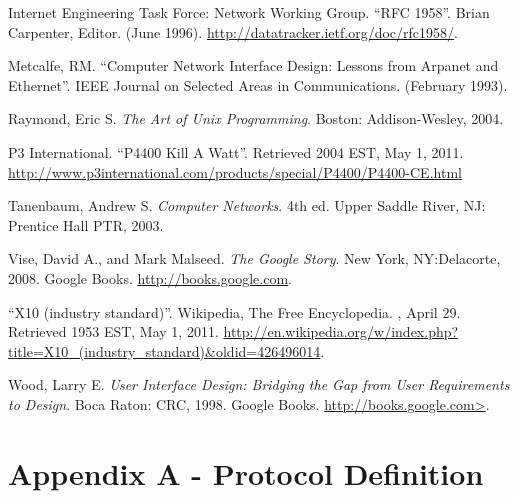 \documentclass[12pt]{article}
\begin{document}
\renewcommand{\refname}{\section{References}}
\begin{thebibliography}{10}

 Internet Engineering Task Force: Network Working Group.
  \newblock ``RFC 1958''.
  \newblock Brian Carpenter, Editor.
  \newblock (June 1996).
  \newblock \url{http://datatracker.ietf.org/doc/rfc1958/}.

 Metcalfe, RM.
  \newblock ``Computer Network Interface Design: Lessons from
  Arpanet and Ethernet''.
  \newblock IEEE Journal on Selected Areas in Communications.
  \newblock (February 1993).

 Raymond, Eric S.
  \newblock \emph{The Art of Unix Programming}.
  \newblock Boston: Addison-Wesley, 2004.

 P3 International.
  \newblock ``P4400 Kill A Watt''.
  \newblock Retrieved 2004 EST, May 1, 2011.
  \newblock \url{http://www.p3international.com/products/special/P4400/P4400-CE.html}

 Tanenbaum, Andrew S.
  \newblock \emph{Computer Networks}. 4th ed.
  \newblock Upper Saddle River, NJ: Prentice Hall PTR, 2003.

 Vise, David A., and Mark Malseed.
  \newblock \emph{The Google Story}.
  \newblock New York, NY:Delacorte, 2008.
  \newblock Google Books.
  \newblock \url{http://books.google.com}.

 ``X10 (industry standard)''.
  \newblock Wikipedia, The Free Encyclopedia.
  , April 29.  Retrieved 1953 EST, May 1, 2011.
  \newblock \url{http://en.wikipedia.org/w/index.php?title=X10_(industry_standard)&oldid=426496014}.

 Wood, Larry E.
  \newblock \emph{User Interface Design: Bridging the Gap from User
    Requirements to Design}.
  \newblock Boca Raton: CRC, 1998.
  \newblock Google Books.
  \newblock \url{http://books.google.com>}.

\end{thebibliography}

\pagebreak

\section{Appendix A - Protocol Definition}
\label{sec:AppendixA}
\end{document}
